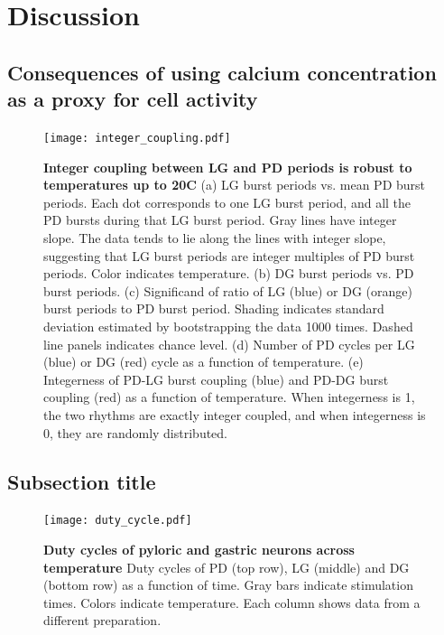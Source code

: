 \documentclass[9pt,lineno]{elife}
\begin{document}
\section{Discussion}




\subsection{Consequences of using calcium concentration as a proxy for cell activity}

\lipsum[5]

\begin{figure}[!htp]
\centering
\begin{fullwidth}
\texttt{[image: integer\_coupling.pdf]}
\end{fullwidth}
\caption{\textbf{Integer coupling between LG and PD periods is robust to temperatures up to 20\degree C} (a) LG burst periods vs. mean PD burst periods. Each dot corresponds to one LG burst period, and all the PD bursts during that LG burst period. Gray lines have integer slope. The data tends to lie along the lines with integer slope, suggesting that LG burst periods are integer multiples of PD burst periods. Color indicates temperature. (b) DG burst periods vs. PD burst periods. (c) Significand of ratio of LG (blue) or DG (orange) burst periods to PD burst period. Shading indicates standard deviation estimated by bootstrapping the data 1000 times.  Dashed line panels indicates chance level. (d) Number of PD cycles per LG (blue) or DG (red) cycle as a function of temperature. (e) Integerness of PD-LG burst coupling (blue) and PD-DG burst coupling (red) as a function of temperature. When integerness is 1, the two rhythms are exactly integer coupled, and when integerness is 0, they are randomly distributed.   }
\end{figure}


\lipsum[1]

\subsection{Subsection title}

\lipsum[2]


\begin{figure}
\begin{fullwidth}
\texttt{[image: duty\_cycle.pdf]}

\caption{\textbf{Duty cycles of pyloric and gastric neurons across temperature } Duty cycles of PD (top row), LG (middle) and DG (bottom row) as a function of time. Gray bars indicate stimulation times. Colors indicate temperature. Each column shows data from a different preparation.    } 
\label{fig:8}
\end{fullwidth}
\end{figure}
\end{document}
